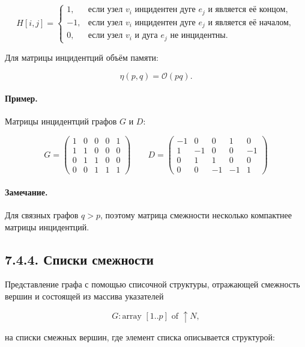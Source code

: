 {\[
H[i, j] =
\begin{cases}
1, & \text{если узел } v_i \text{ инцидентен дуге } e_j \text{ и является её концом}, \\
-1, & \text{если узел } v_i \text{ инцидентен дуге } e_j \text{ и является её началом}, \\
0, & \text{если узел } v_i \text{ и дуга } e_j \text{ не инцидентны}.
\end{cases}
\]



Для матрицы инцидентций объём памяти:


\[
\eta(p, q) = \mathcal{O}(pq).
\]



\paragraph{Пример.} Матрицы инцидентций графов $G$ и $D$:



\[
G =
\begin{pmatrix}
1 & 0 & 0 & 0 & 1 \\
1 & 1 & 0 & 0 & 0 \\
0 & 1 & 1 & 0 & 0 \\
0 & 0 & 1 & 1 & 1
\end{pmatrix}
\qquad
D =
\begin{pmatrix}
-1 & 0 & 0 & 1 & 0 \\
1 & -1 & 0 & 0 & -1 \\
0 & 1 & 1 & 0 & 0 \\
0 & 0 & -1 & -1 & 1
\end{pmatrix}
\]



\paragraph{Замечание.}
Для связных графов $q > p$, поэтому матрица смежности несколько компактнее матрицы инцидентций.

\subsection*{7.4.4. Списки смежности}

Представление графа с помощью списочной структуры, отражающей смежность вершин и состоящей из массива указателей


\[
G : \text{array } [1..p] \text{ of } \uparrow N,
\]


на списки смежных вершин, где элемент списка описывается структурой:


}
